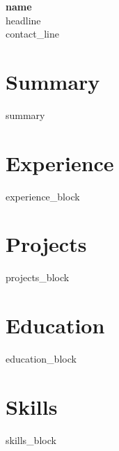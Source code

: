 \documentclass[11pt,a4paper]{article}
\begin{document}
\begin{center}
  {\Huge\bfseries\color{accent} {{name}}}\\[4pt]
  {\large\color{muted} {{headline}}}\\[6pt]
  {\small {{contact_line}}}
\end{center}

\section*{Summary}
{{summary}}

\section*{Experience}
{{experience_block}}

\section*{Projects}
{{projects_block}}

\section*{Education}
{{education_block}}

\section*{Skills}
{{skills_block}}
\end{document}
